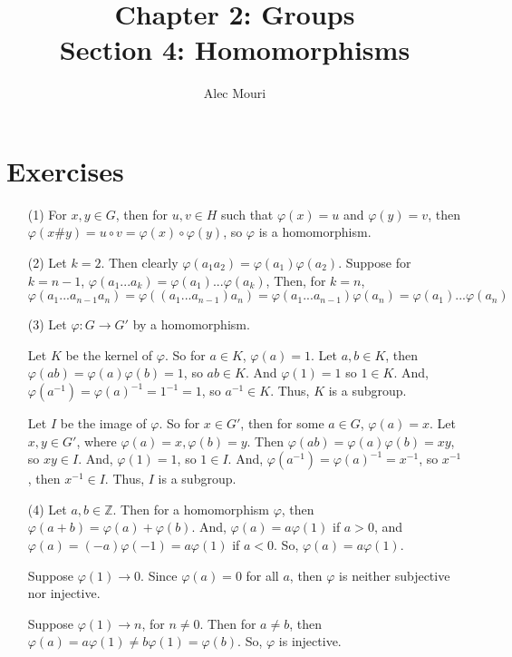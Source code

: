 \documentclass[12pt]{article}
\begin{document}
\title{Chapter 2: Groups \\ Section 4: Homomorphisms}
\author{Alec Mouri}

\maketitle
\section*{Exercises}
\begin{itemize}
\item[(1)]
For $x, y \in G$, then for $u, v \in H$ such that $\varphi(x) = u$ and $\varphi(y) = v$, then $\varphi(x \# y) = u \circ v = \varphi(x) \circ \varphi(y)$, so $\varphi$ is a homomorphism.
\item[(2)] Let $k = 2$. Then clearly $\varphi(a_1a_2) = \varphi(a_1)\varphi(a_2)$. Suppose for $k = n - 1$, $\varphi(a_1...a_k) = \varphi(a_1)...\varphi(a_k)$, Then, for $k = n$,
$$\varphi(a_1...a_{n-1}a_n) = \varphi((a_1...a_{n-1})a_n) = \varphi(a_1...a_{n-1})\varphi(a_n) = \varphi(a_1)...\varphi(a_n)$$
\item[(3)]
Let $\varphi: G \rightarrow G'$ by a homomorphism.

Let $K$ be the kernel of $\varphi$. So for $a \in K$, $\varphi(a) = 1$. Let $a, b \in K$, then $\varphi(ab) = \varphi(a)\varphi(b) = 1$, so $ab \in K$. And $\varphi(1) = 1$ so $1 \in K$. And, $\varphi(a^{-1}) = \varphi(a)^{-1} = 1^{-1} = 1$, so $a^{-1} \in K$. Thus, $K$ is a subgroup.

Let $I$ be the image of $\varphi$. So for $x \in G'$, then for some $a \in G$, $\varphi(a) = x$. Let $x, y \in G'$, where $\varphi(a) = x, \varphi(b) = y$. Then $\varphi(ab) = \varphi(a)\varphi(b) = xy$, so $xy \in I$. And, $\varphi(1) = 1$, so $1 \in I$. And, $\varphi(a^{-1}) = \varphi(a)^{-1} = x^{-1}$, so $x^{-1}$, then $x^{-1} \in I$. Thus, $I$ is a subgroup.
\item[(4)] Let $a, b \in \mathbb{Z}$. Then for a homomorphism $\varphi$, then $\varphi(a+b) = \varphi(a) + \varphi(b)$. And, $\varphi(a) = a\varphi(1)$ if $a >0$, and $\varphi(a) = (-a)\varphi(-1) = a\varphi(1)$ if $a < 0$. So, $\varphi(a) = a\varphi(1)$.

Suppose $\varphi(1) \rightarrow 0$. Since $\varphi(a) = 0$ for all $a$, then $\varphi$ is neither subjective nor injective.

Suppose $\varphi(1) \rightarrow n$, for $n \neq 0$. Then for $a \neq b$, then $\varphi(a) = a\varphi(1) \neq b\varphi(1) = \varphi(b)$. So, $\varphi$ is injective.


\end{itemize}
\end{document}

